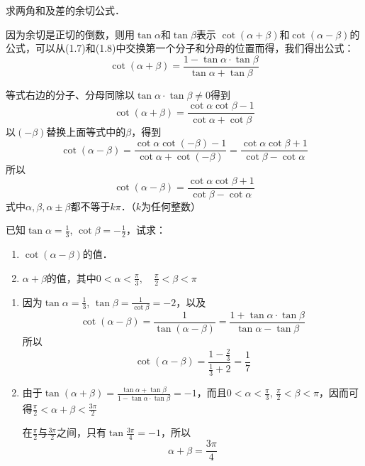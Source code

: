 \begin{example}
求两角和及差的余切公式．
\end{example}

\begin{solution}
 因为余切是正切的倒数，则用$\tan\alpha$和$\tan\beta$表示
    $\cot (\alpha+\beta)$和$\cot(\alpha-\beta)$的公式，可以从(1.7)和(1.8)中交换第一个分子和分母的位置而得，我们得出公式：
\[    \cot (\alpha+\beta)=\frac{1-\tan\alpha\cdot\tan \beta}{\tan\alpha+\tan \beta}\]
   
等式右边的分子、分母同除以$\tan\alpha\cdot\tan\beta\ne 0$得到 
\begin{equation}
    \cot(\alpha+\beta)=\frac{\cot\alpha\cot\beta-1}{\cot\alpha+\cot\beta}
\end{equation}
以$(-\beta)$替换上面等式中的$\beta$，得到
\[
    \cot(\alpha-\beta)=\frac{\cot\alpha\cot(-\beta)-1}{\cot\alpha+\cot(-\beta)}=\frac{\cot\alpha\cot\beta+1}{\cot\beta-\cot\alpha}
\]
所以
\begin{equation}
    \cot(\alpha-\beta)=\frac{\cot\alpha\cot\beta+1}{\cot\beta-\cot\alpha}  
\end{equation}
式中$\alpha,\beta,\alpha\pm\beta$都不等于$k\pi$．（$k$为任何整数）
\end{solution}

\begin{example}
已知$\tan\alpha=\frac{1}{3}$, $\cot\beta=-\frac{1}{2}$，试求：
\begin{enumerate}
    \item $\cot(\alpha-\beta)$的值．
    \item $\alpha+\beta$的值，其中$0<\alpha<\frac{\pi}{3},\quad \frac{\pi}{2}<\beta<\pi$
\end{enumerate}
\end{example}

\begin{solution}
\begin{enumerate}
    \item 因为$\tan\alpha=\frac{1}{3}$, $\tan\beta=\frac{1}{\cot\beta}=-2$，以及
\[\cot(\alpha-\beta)=\frac{1}{\tan(\alpha-\beta)}=\frac{1+\tan\alpha\cdot \tan\beta}{\tan\alpha-\tan\beta}\]
所以
\[\cot(\alpha-\beta)=\frac{1-\frac{2}{3}}{\frac{1}{3}+2}=\frac{1}{7} \]

\item 由于$\tan(\alpha+\beta)=\frac{\tan \alpha+\tan\beta}{1-\tan\alpha\cdot \tan\beta}=-1$，而且$0<\alpha<\frac{\pi}{3}$, $\frac{\pi}{2}<\beta<\pi$，因而可得$\frac{\pi}{2}<\alpha+\beta<\frac{3\pi}{2}$

在$\frac{\pi}{2}$与$\frac{3\pi}{2}$之间，只有$\tan\frac{3\pi}{4}=-1$，所以
\[\alpha+\beta =\frac{3\pi}{4}\]
\end{enumerate}    
\end{solution}

